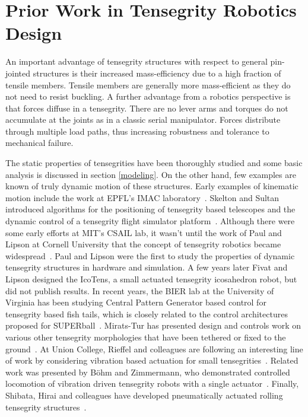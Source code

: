 \section{Prior Work in Tensegrity Robotics Design}
An important advantage of tensegrity structures with respect to general pin-jointed structures is their increased mass-efficiency due to a high fraction of tensile members.
Tensile members are generally more mass-efficient as they do not need to resist buckling.
A further advantage from a robotics perspective is that forces diffuse in a tensegrity.
There are no lever arms and torques do not accumulate at the joints as in a classic serial manipulator.
Forces distribute through multiple load paths, thus increasing robustness and tolerance to mechanical failure.

The static properties of tensegrities have been thoroughly studied and some basic analysis is discussed in section \ref{modeling}.
On the other hand, few examples are known of truly dynamic motion of these structures.
Early examples of kinematic motion include the work at EPFL's IMAC laboratory~\cite{Fest2004}.
Skelton and Sultan introduced algorithms for the positioning of tensegrity based telescopes and the dynamic control of a tensegrity flight simulator platform~\cite{sultan2000tensegrity}.
Although there were some early efforts at MIT's CSAIL lab, it wasn't until the work of Paul and Lipson at Cornell University that the concept of tensegrity robotics became widespread~\cite{Paul2006a}.
Paul and Lipson were the first to study the properties of dynamic tensegrity structures in hardware and simulation.
A few years later Fivat and Lipson designed the IcoTens, a small actuated tensegrity icosahedron robot, but did not publish results.
In recent years, the BIER lab at the University of Virginia has been studying Central Pattern Generator based control for tensegrity based fish tails,
which is closely related to the control architectures proposed for SUPERball~\cite{Caluwaerts2013rsif,Bliss2012}.
Mirats-Tur has presented design and controls work on various other tensegrity morphologies that have been tethered or fixed to the ground~\cite{GraellsRovira2009,miratstur2011athree-dof}.
At Union College, Rieffel and colleagues are following an interesting line of work by considering vibration based actuation for small tensegrities~\cite{khazanov2014developing}.
Related work was presented by B\"ohm and Zimmermann, who demonstrated controlled locomotion of vibration driven tensegrity robots with a single actuator~\cite{bohm2013vibration}.
Finally, Shibata, Hirai and colleagues have developed pneumatically actuated rolling tensegrity structures~\cite{Shibata2009}. 

